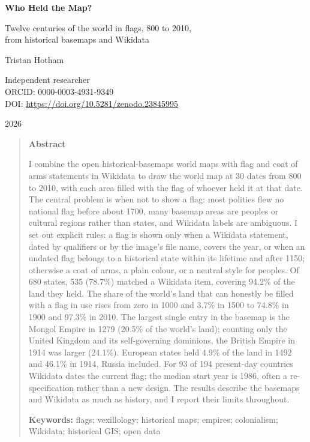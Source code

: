\documentclass[11pt,a4paper]{article}
\begin{document}
\begin{center}
{\Large\bfseries Who Held the Map?\par}
\vspace{0.4em}
{\large Twelve centuries of the world in flags, 800 to 2010,\\from historical basemaps and Wikidata\par}
\vspace{1.2em}
{\large Tristan Hotham\par}
\vspace{0.3em}
{\small Independent researcher\\
ORCID: 0000-0003-4931-9349\\
DOI: \href{https://doi.org/10.5281/zenodo.23845995}{https://doi.org/10.5281/zenodo.23845995}\par}
\vspace{0.8em}
2026
\end{center}

\begin{quote}
\small
\begin{center}\textbf{Abstract}\end{center}
I combine the open historical-basemaps world maps \citep{ourednik} with flag and coat of arms statements in Wikidata to draw the world map at 30 dates from 800 to 2010, with each area filled with the flag of whoever held it at that date. The central problem is when not to show a flag: most polities flew no national flag before about 1700, many basemap areas are peoples or cultural regions rather than states, and Wikidata labels are ambiguous. I set out explicit rules: a flag is shown only when a Wikidata statement, dated by qualifiers or by the image's file name, covers the year, or when an undated flag belongs to a historical state within its lifetime and after 1150; otherwise a coat of arms, a plain colour, or a neutral style for peoples. Of 680 states, 535 (78.7\%) matched a Wikidata item, covering 94.2\% of the land they held. The share of the world's land that can honestly be filled with a flag in use rises from zero in 1000 and 3.7\% in 1500 to 74.8\% in 1900 and 97.3\% in 2010. The largest single entry in the basemap is the Mongol Empire in 1279 (20.5\% of the world's land); counting only the United Kingdom and its self-governing dominions, the British Empire in 1914 was larger (24.1\%). European states held 4.9\% of the land in 1492 and 46.1\% in 1914, Russia included. For 93 of 194 present-day countries Wikidata dates the current flag; the median start year is 1986, often a re-specification rather than a new design. The results describe the basemaps and Wikidata as much as history, and I report their limits throughout.

\textbf{Keywords:} flags; vexillology; historical maps; empires; colonialism; Wikidata; historical GIS; open data
\end{quote}
\end{document}
